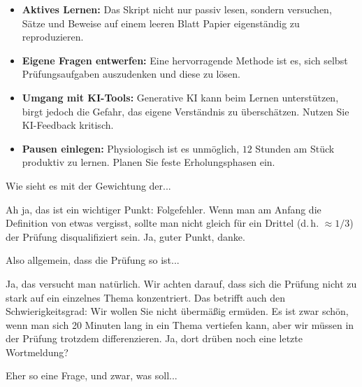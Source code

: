 \begin{nice-box}
\begin{itemize}
    \item \textbf{Aktives Lernen:} Das Skript nicht nur passiv lesen, sondern versuchen, Sätze und Beweise auf einem leeren Blatt Papier eigenständig zu reproduzieren.
    \item \textbf{Eigene Fragen entwerfen:} Eine hervorragende Methode ist es, sich selbst Prüfungsaufgaben auszudenken und diese zu lösen.
    \item \textbf{Umgang mit KI-Tools:} Generative KI kann beim Lernen unterstützen, birgt jedoch die Gefahr, das eigene Verständnis zu überschätzen. Nutzen Sie KI-Feedback kritisch.
    \item \textbf{Pausen einlegen:} Physiologisch ist es unmöglich, $12$ Stunden am Stück produktiv zu lernen. Planen Sie feste Erholungsphasen ein.
\end{itemize}
\end{nice-box}

\begin{student-interaction}[Studentenfrage]
Wie sieht es mit der Gewichtung der...
\end{student-interaction}

\begin{spoken-clean}[01:26:54 - 01:27:19]
Ah ja, das ist ein wichtiger Punkt: Folgefehler. Wenn man am Anfang die Definition von etwas vergisst, sollte man nicht gleich für ein Drittel (d.\,h. $\approx 1/3$) der Prüfung disqualifiziert sein. Ja, guter Punkt, danke.
\end{spoken-clean}

\begin{student-interaction}[Studentenfrage]
Also allgemein, dass die Prüfung so ist...
\end{student-interaction}

\begin{spoken-clean}[01:27:19 - 01:27:49]
Ja, das versucht man natürlich. Wir achten darauf, dass sich die Prüfung nicht zu stark auf ein einzelnes Thema konzentriert. Das betrifft auch den Schwierigkeitsgrad: Wir wollen Sie nicht übermäßig ermüden. Es ist zwar schön, wenn man sich 20 Minuten lang in ein Thema vertiefen kann, aber wir müssen in der Prüfung trotzdem differenzieren. Ja, dort drüben noch eine letzte Wortmeldung?
\end{spoken-clean}

\begin{student-interaction}[Studentenfrage]
Eher so eine Frage, und zwar, was soll...
\end{student-interaction}

